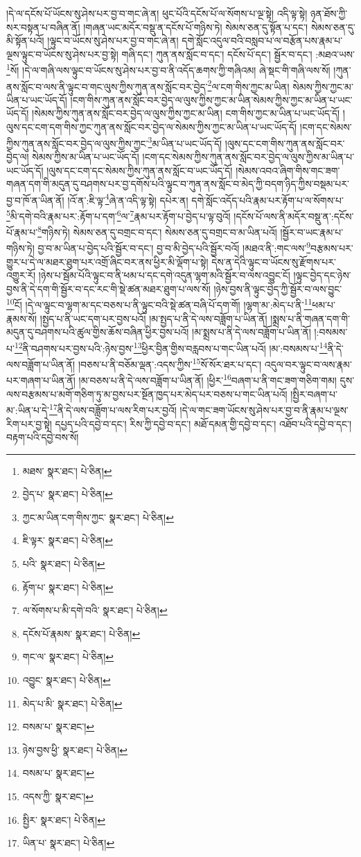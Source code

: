 །དེ་ལ་དངོས་པོ་ཡོངས་སུ་ཤེས་པར་བྱ་བ་གང་ཞེ་ན། ཕུང་པོའི་དངོས་པོ་ལ་སོགས་པ་ལྔ་སྟེ། འདི་ལྟ་སྟེ། ཉན་ཐོས་ཀྱི་སར་བསྟན་པ་བཞིན་ནོ། །གཞན་ཡང་མདོར་བསྡུ་ན་དངོས་པོ་གཉིས་ཏེ། སེམས་ཅན་དུ་སྟོན་པ་དང་། སེམས་ཅན་དུ་མི་སྟོན་པའོ། །ལྟུང་བ་ཡོངས་སུ་ཤེས་པར་བྱ་བ་གང་ཞེ་ན། དགེ་སློང་འདུལ་བའི་བསླབ་པ་ལ་བརྩོན་པས་རྣམ་པ་ལྔས་ལྟུང་བ་ཡོངས་སུ་ཤེས་པར་བྱ་སྟེ། གཞི་དང་། ཀུན་ནས་སློང་བ་དང་། དངོས་པོ་དང་། སྦྱོར་བ་དང་། :མཐའ་ཡས་\footnote{མཐས་  སྣར་ཐང་།  པེ་ཅིན། }སོ། །དེ་ལ་གཞི་ལས་ལྟུང་བ་ཡོངས་སུ་ཤེས་པར་བྱ་བ་ནི་འདོད་ཆགས་ཀྱི་གཞིའམ། ཞེ་སྡང་གི་གཞི་ལས་སོ། །ཀུན་ནས་སློང་བ་ལས་ནི་ལྟུང་བ་གང་ལུས་ཀྱིས་ཀུན་ནས་སློང་བར་བྱེད་\footnote{བྱེད་པ་  སྣར་ཐང་།  པེ་ཅིན། }ལ་ངག་གིས་ཀྱང་མ་ཡིན། སེམས་ཀྱིས་ཀྱང་མ་ཡིན་པ་ཡང་ཡོད་དོ། །ངག་གིས་ཀུན་ནས་སློང་བར་བྱེད་ལ་ལུས་ཀྱིས་ཀྱང་མ་ཡིན་སེམས་ཀྱིས་ཀྱང་མ་ཡིན་པ་ཡང་ཡོད་དོ། །སེམས་ཀྱིས་ཀུན་ནས་སློང་བར་བྱེད་ལ་ལུས་ཀྱིས་ཀྱང་མ་ཡིན། ངག་གིས་ཀྱང་མ་ཡིན་པ་ཡང་ཡོད་དོ། །ལུས་དང་ངག་དག་གིས་ཀྱང་ཀུན་ནས་སློང་བར་བྱེད་ལ་སེམས་ཀྱིས་ཀྱང་མ་ཡིན་པ་ཡང་ཡོད་དོ། །ངག་དང་སེམས་ཀྱིས་ཀུན་ནས་སློང་བར་བྱེད་ལ་ལུས་ཀྱིས་ཀྱང་\footnote{ཀྱང་མ་ཡིན་ངག་གིས་ཀྱང་  སྣར་ཐང་།  པེ་ཅིན། }མ་ཡིན་པ་ཡང་ཡོད་དོ། །ལུས་དང་ངག་གིས་ཀུན་ནས་སློང་བར་བྱེད་ལ། སེམས་ཀྱིས་མ་ཡིན་པ་ཡང་ཡོད་དོ། །ངག་དང་སེམས་ཀྱིས་ཀུན་ནས་སློང་བར་བྱེད་ལ་ལུས་ཀྱིས་མ་ཡིན་པ་ཡང་ཡོད་དོ། །ལུས་དང་ངག་དང་སེམས་ཀྱིས་ཀུན་ནས་སློང་བ་ཡང་ཡོད་དོ། །སེམས་འབའ་ཞིག་གིས་གང་ཟག་གཞན་དག་གི་མདུན་དུ་བཤགས་པར་བྱ་དགོས་པའི་ལྟུང་བ་ཀུན་ནས་སློང་བ་མེད་ཀྱི་བདག་ཉིད་ཀྱིས་བསྡམ་པར་བྱ་བ་ཁོ་ན་ཡིན་ནོ། །འོ་ན་:ཇི་ལྟ་\footnote{ཇི་ལྟར་  སྣར་ཐང་།  པེ་ཅིན། }ཞེ་ན་འདི་ལྟ་སྟེ། དཔེར་ན། དགེ་སློང་འདོད་པའི་རྣམ་པར་རྟོག་པ་ལ་སོགས་པ་\footnote{པའི་  སྣར་ཐང་།  པེ་ཅིན། }མི་དགེ་བའི་རྣམ་པར་:རྟོག་པ་དག་\footnote{རྟོག་པ་  སྣར་ཐང་།  པེ་ཅིན། }ལ་\footnote{ལ་སོགས་པ་མི་དགེ་བའི་  སྣར་ཐང་།  པེ་ཅིན། }རྣམ་པར་རྟོག་པ་བྱེད་པ་ལྟ་བུའོ། །དངོས་པོ་ལས་ནི་མདོར་བསྡུ་ན་:དངོས་པོ་རྣམ་པ་\footnote{དངོས་པོ་རྣམས་  སྣར་ཐང་།  པེ་ཅིན། }གཉིས་ཏེ། སེམས་ཅན་དུ་བགྲང་བ་དང་། སེམས་ཅན་དུ་བགྲང་བ་མ་ཡིན་པའོ། །སྦྱོར་བ་ཡང་རྣམ་པ་གཉིས་ཏེ། བྱ་བ་མ་ཡིན་པ་བྱེད་པའི་སྦྱོར་བ་དང་། བྱ་བ་མི་བྱེད་པའི་སྦྱོར་བའོ། །མཐའ་ནི་:གང་ལས་\footnote{གང་ལ་  སྣར་ཐང་།  པེ་ཅིན། }བརྩམས་པར་གྱུར་པ་དེ་ལ་མཐར་ཐུག་པར་འགྲོ་ཞིང་བར་ནས་ཕྱིར་མི་ལྡོག་པ་སྟེ། དེས་ན་དེའི་ལྟུང་བ་ཡོངས་སུ་རྫོགས་པར་འགྱུར་རོ། །ཉེས་པ་སྦོམ་པོའི་ལྟུང་བ་ནི་ཕམ་པ་དང་དགེ་འདུན་ལྷག་མའི་སྦྱོར་བ་ལས་འབྱུང་ངོ། །ལྟུང་བྱེད་དང་ཉེས་བྱས་ནི་དེ་དག་གི་སྦྱོར་བ་དང་རང་གི་སྡེ་ཚན་མཐར་ཐུག་པ་ལས་སོ། །ཉེས་བྱས་ནི་ལྟུང་བྱེད་ཀྱི་སྦྱོར་བ་ལས་བྱུང་\footnote{འབྱུང་  སྣར་ཐང་།  པེ་ཅིན། }ངོ། །དེ་ལ་ལྟུང་བ་ལྷག་མ་དང་བཅས་པ་ནི་ལྟུང་བའི་སྡེ་ཚན་བཞི་པོ་དག་གོ། །ལྷག་མ་:མེད་པ་ནི་\footnote{མེད་པ་མི་  སྣར་ཐང་།  པེ་ཅིན། }ཕམ་པ་རྣམས་སོ། །སྤྱད་པ་ནི་ཡང་དག་པར་བྱས་པའོ། །མ་སྤྱད་པ་ནི་དེ་ལས་བཟློག་པ་ཡིན་ནོ། །སྨྲས་པ་ནི་གཞན་དག་གི་མདུན་དུ་བཤགས་པའི་ཚུལ་གྱིས་ཆོས་བཞིན་ཕྱིར་བྱས་པའོ། །མ་སྨྲས་པ་ནི་དེ་ལས་བཟློག་པ་ཡིན་ནོ། །:བསམས་པ་\footnote{བསམ་པ་  སྣར་ཐང་། }ནི་བཤགས་པར་བྱས་པའི་:ཉེས་བྱས་\footnote{ཉེས་བྱས་ཕྱི་  སྣར་ཐང་།  པེ་ཅིན། }ཕྱིར་བྱིན་གྱིས་བརླབས་པ་གང་ཡིན་པའོ། །མ་:བསམས་པ་\footnote{བསམ་པ་  སྣར་ཐང་། }ནི་དེ་ལས་བཟློག་པ་ཡིན་ནོ། །བཅས་པ་ནི་བཅོམ་ལྡན་:འདས་ཀྱིས་\footnote{འདས་ཀྱི་  སྣར་ཐང་། }སོ་སོར་ཐར་པ་དང་། འདུལ་བར་ལྟུང་བ་ལས་རྣམ་པར་གཞག་པ་ཡིན་ནོ། །མ་བཅས་པ་ནི་དེ་ལས་བཟློག་པ་ཡིན་ནོ། །ཕྱིར་\footnote{སྤྱིར་  སྣར་ཐང་།  པེ་ཅིན། }བཞག་པ་ནི་གང་ཟག་གཅིག་གམ། དུས་ལས་བརྩམས་པ་མགོ་གཅིག་ཏུ་མ་བྱས་པར་སྔོན་ཁྱད་པར་མེད་པར་བཅས་པ་གང་ཡིན་པའོ། །སྤྱིར་བཞག་པ་མ་:ཡིན་པ་དེ་\footnote{ཡིན་པ་  སྣར་ཐང་།  པེ་ཅིན། }ནི་དེ་ལས་བཟློག་པ་ལས་རིག་པར་བྱའོ། །དེ་ལ་གང་ཟག་ཡོངས་སུ་ཤེས་པར་བྱ་བ་ནི་རྣམ་པ་ལྔས་རིག་པར་བྱ་སྟེ། དཔྱད་པའི་དབྱེ་བ་དང་། རིས་ཀྱི་དབྱེ་བ་དང་། མཐོ་དམན་གྱི་དབྱེ་བ་དང་། འཐོབ་པའི་དབྱེ་བ་དང་། བརྟག་པའི་དབྱེ་བས་སོ། 